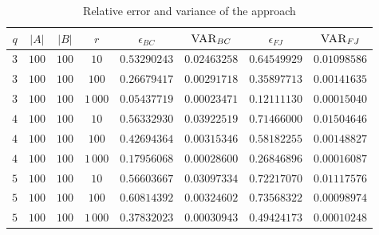 \begin{table}[h]
	\centering
	\begin{tabular}{|c|c|c|c|c|c|c|c|}
		\hline
		$q$ & $|A|$ & $|B|$ & $r$      & $\epsilon_{BC}$ & $\textsc{VAR}_{BC}$ & $\epsilon_{FJ}$ & $\textsc{VAR}_{FJ}$ \\ \hline \hline
		$3$ & $100$ & $100$ & $10$     & $0.53290243$    & $0.02463258$        & $0.64549929$    & $0.01098586$        \\ \hline
		$3$ & $100$ & $100$ & $100$    & $0.26679417$    & $0.00291718$        & $0.35897713$    & $0.00141635$        \\ \hline
		$3$ & $100$ & $100$ & $1\,000$ & $0.05437719$    & $0.00023471$        & $0.12111130$    & $0.00015040$        \\ \hline \hline
		$4$ & $100$ & $100$ & $10$     & $0.56332930$    & $0.03922519$        & $0.71466000$    & $0.01504646$        \\ \hline
		$4$ & $100$ & $100$ & $100$    & $0.42694364$    & $0.00315346$        & $0.58182255$    & $0.00148827$        \\ \hline
		$4$ & $100$ & $100$ & $1\,000$ & $0.17956068$    & $0.00028600$        & $0.26846896$    & $0.00016087$        \\ \hline \hline
		$5$ & $100$ & $100$ & $10$     & $0.56603667$    & $0.03097334$        & $0.72217070$    & $0.01117576$        \\ \hline
		$5$ & $100$ & $100$ & $100$    & $0.60814392$    & $0.00324602$        & $0.73568322$    & $0.00098974$        \\ \hline
		$5$ & $100$ & $100$ & $1\,000$ & $0.37832023$    & $0.00030943$        & $0.49424173$    & $0.00010248$        \\ \hline
	\end{tabular}
	\caption{Relative error and variance of the \fsamp approach}	
\end{table}

